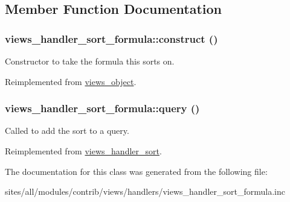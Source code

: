 \subsection{Member Function Documentation}
\hypertarget{classviews__handler__sort__formula_19d1b335b939c45903815256b5a6e0b8}{
\subsubsection[{construct}]{\setlength{\rightskip}{0pt plus 5cm}views\_\-handler\_\-sort\_\-formula::construct ()}}
\label{classviews__handler__sort__formula_19d1b335b939c45903815256b5a6e0b8}


Constructor to take the formula this sorts on. 

Reimplemented from \hyperlink{classviews__object_6583d6be7e59dd1e39056e320ea2c2d4}{views\_\-object}.\hypertarget{classviews__handler__sort__formula_208dff453ab94f55000e8027ed3c8588}{
\subsubsection[{query}]{\setlength{\rightskip}{0pt plus 5cm}views\_\-handler\_\-sort\_\-formula::query ()}}
\label{classviews__handler__sort__formula_208dff453ab94f55000e8027ed3c8588}


Called to add the sort to a query. 

Reimplemented from \hyperlink{classviews__handler__sort_94fa33c5d037e41a927583fce2df3d18}{views\_\-handler\_\-sort}.

The documentation for this class was generated from the following file:\begin{CompactItemize}
\item 
sites/all/modules/contrib/views/handlers/views\_\-handler\_\-sort\_\-formula.inc\end{CompactItemize}
